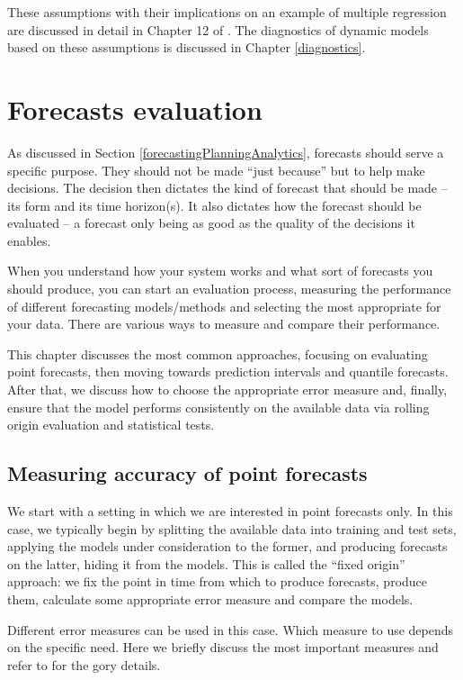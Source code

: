 \documentclass[
]{book}
\theoremstyle{definition}
\theoremstyle{definition}
\theoremstyle{definition}
\theoremstyle{definition}
\theoremstyle{remark}
\begin{document}
These assumptions with their implications on an example of multiple regression are discussed in detail in Chapter 12 of \citet{SvetunkovSBA}. The diagnostics of dynamic models based on these assumptions is discussed in Chapter \ref{diagnostics}.

\hypertarget{forecastsEvaluation}{%
\chapter{Forecasts evaluation}\label{forecastsEvaluation}}

As discussed in Section \ref{forecastingPlanningAnalytics}, forecasts should serve a specific purpose. They should not be made ``just because'' but to help make decisions. The decision then dictates the kind of forecast that should be made -- its form and its time horizon(s). It also dictates how the forecast should be evaluated -- a forecast only being as good as the quality of the decisions it enables.

When you understand how your system works and what sort of forecasts you should produce, you can start an evaluation process, measuring the performance of different forecasting models/methods and selecting the most appropriate for your data. There are various ways to measure and compare their performance.

This chapter discusses the most common approaches, focusing on evaluating point forecasts, then moving towards prediction intervals and quantile forecasts. After that, we discuss how to choose the appropriate error measure and, finally, ensure that the model performs consistently on the available data via rolling origin evaluation and statistical tests.

\hypertarget{errorMeasures}{%
\section{Measuring accuracy of point forecasts}\label{errorMeasures}}

We start with a setting in which we are interested in point forecasts only. In this case, we typically begin by splitting the available data into training and test sets, applying the models under consideration to the former, and producing forecasts on the latter, hiding it from the models. This is called the ``fixed origin'' approach: we fix the point in time from which to produce forecasts, produce them, calculate some appropriate error measure and compare the models.

Different error measures can be used in this case. Which measure to use depends on the specific need. Here we briefly discuss the most important measures and refer to \citep{Davydenko2013, SvetunkovAccuracy2019, SvetunkovAPEs2017} for the gory details.
\end{document}
